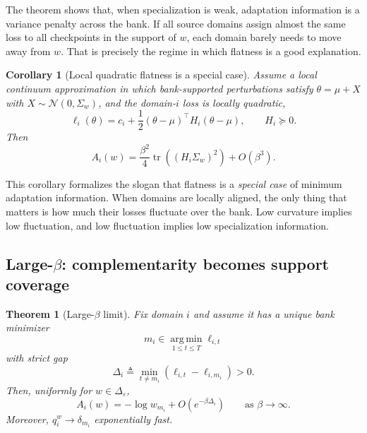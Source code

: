 \documentclass{article}
\newtheorem{theorem}{Theorem}
\newtheorem{corollary}{Corollary}
\newcommand{\tr}{\operatorname{tr}}
\newcommand{\argmin}{\operatorname*{arg\,min}}
\newcommand{\simplex}{\Delta}
\newcommand{\epssimplex}{\simplex_{\varepsilon}}
\begin{document}
The theorem shows that, when specialization is weak, adaptation information is a variance penalty across the bank. If all source domains assign almost the same loss to all checkpoints in the support of \(w\), each domain barely needs to move away from \(w\). That is precisely the regime in which flatness is a good explanation.

\begin{corollary}[Local quadratic flatness is a special case]
\label{cor:quadratic_flatness}
Assume a local continuum approximation in which bank-supported perturbations satisfy \(\theta = \mu + X\) with \(X \sim \mathcal{N}(0,\Sigma_w)\), and the domain-\(i\) loss is locally quadratic,
\begin{equation}
    \ell_i(\theta)
    =
    c_i + \frac{1}{2}(\theta-\mu)^\top H_i (\theta-\mu),
    \qquad H_i \succeq 0.
\end{equation}
Then
\begin{equation}
    A_i(w)
    =
    \frac{\beta^2}{4}\tr\!\left((H_i\Sigma_w)^2\right)
    + O(\beta^3).
\end{equation}
\end{corollary}

This corollary formalizes the slogan that flatness is a \emph{special case} of minimum adaptation information. When domains are locally aligned, the only thing that matters is how much their losses fluctuate over the bank. Low curvature implies low fluctuation, and low fluctuation implies low specialization information.

\subsection{Large-\(\beta\): complementarity becomes support coverage}

\begin{theorem}[Large-\(\beta\) limit]
\label{thm:large_beta}
Fix domain \(i\) and assume it has a unique bank minimizer
\begin{equation}
    m_i \in \argmin_{1\le t\le T}\ell_{i,t}
\end{equation}
with strict gap
\begin{equation}
    \Delta_i \triangleq \min_{t \neq m_i} (\ell_{i,t} - \ell_{i,m_i}) > 0.
\end{equation}
Then, uniformly for \(w \in \epssimplex\),
\begin{equation}
    A_i(w)
    =
    -\log w_{m_i}
    + O(e^{-\beta \Delta_i})
    \qquad
    \text{as } \beta \to \infty.
\end{equation}
Moreover, \(q_i^w \to \delta_{m_i}\) exponentially fast.
\end{theorem}
\end{document}
